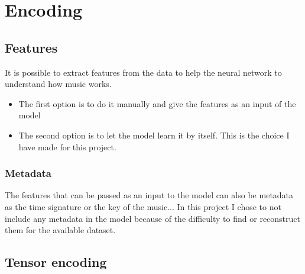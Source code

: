 \documentclass[12pt]{report}
\begin{document}



\section{Encoding}

\subsection{Features}

It is possible to extract features from the data to help the neural network to understand how music works.
\begin{itemize}
    \item The first option is to do it manually and give the features as an input of the model
    \item The second option is to let the model learn it by itself. This is the choice I have made for this project.
\end{itemize}

\subsubsection{Metadata}

The features that can be passed as an input to the model can also be metadata as the time signature or the key of the music...
In this project I chose to not include any metadata in the model because of the difficulty to find or reconstruct them for the available dataset.

\subsection{Tensor encoding}
\end{document}
